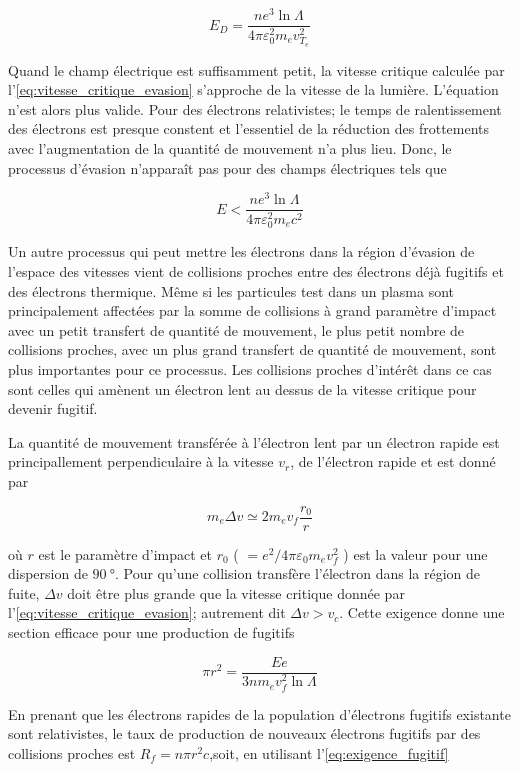 \documentclass[main.tex]{subfiles}
\begin{document}
\[
	E_D = \frac{n e^3 \ln \Lambda}{4 \pi \varepsilon_0^2 m_e v_{T_e}^2}
\]

Quand le champ électrique est suffisamment petit, la vitesse critique calculée par l'\autoref{eq:vitesse_critique_evasion} s'approche de la vitesse de la lumière.
L'équation n'est alors plus valide.
Pour des électrons relativistes; le temps de ralentissement des électrons est presque constent et l'essentiel de la réduction des frottements avec l'augmentation de la quantité de mouvement n'a plus lieu.
Donc, le processus d'évasion n'apparaît pas pour des champs électriques tels que

\[
	E < \frac{n e^3 \ln \Lambda}{4 \pi \varepsilon_0^2 m_e c^2}
\]

Un autre processus qui peut mettre les électrons dans la région d'évasion de l'espace des vitesses vient de collisions proches entre des électrons déjà fugitifs et des électrons thermique.
Même si les particules test dans un plasma sont principalement affectées par la somme de collisions à grand paramètre d'impact avec un petit transfert de quantité de mouvement, le plus petit nombre de collisions proches, avec un plus grand transfert de quantité de mouvement, sont plus importantes pour ce processus.
Les collisions proches d'intérêt dans ce cas sont celles qui amènent un électron lent au dessus de la vitesse critique pour devenir fugitif.

La quantité de mouvement transférée à l'électron lent par un électron rapide est principallement perpendiculaire à la vitesse \( v_r \), de l'électron rapide et est donné par

\[
	m_e \Delta v \simeq 2 m_e v_f \frac{r_0}{r}
\]

\noindent où \( r \) est le paramètre d'impact et \( r_0 \) ( \( = e^2 / 4 \pi \varepsilon_0 m_e v_f^2 \) ) est la valeur pour une dispersion de \( \SI{90}{\degree} \).
Pour qu'une collision transfère l'électron dans la région de fuite, \( \Delta v \) doit être plus grande que la vitesse critique donnée par l'\autoref{eq:vitesse_critique_evasion}; autrement dit \( \Delta v > v_c \).
Cette exigence donne une section efficace pour une production de fugitifs

\begin{equation}
	\pi r^2 = \frac{E e}{3 n m_e v_f^2 \ln \Lambda}
	\label{eq:exigence_fugitif}
\end{equation}

\noindent En prenant que les électrons rapides de la population d'électrons fugitifs existante sont relativistes, le taux de production de nouveaux électrons fugitifs par des collisions proches est \( R_f = n \pi r^2 c \),soit, en utilisant l'\autoref{eq:exigence_fugitif}
\end{document}
